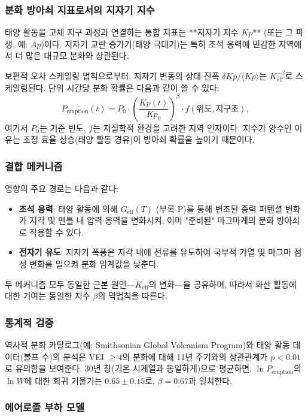 \documentclass[11pt,a4paper]{article}
\newcommand{\Keff}{K_{\mathrm{eff}}}
\begin{document}
	\subsubsection{분화 방아쇠 지표로서의 지자기 지수}
	
	태양 활동을 고체 지구 과정과 연결하는 통합 지표는 **지자기 지수 $Kp$** (또는 그 파생, 예: $Ap$)이다. 지자기 교란 증가기(태양 극대기)는 특히 조석 응력에 민감한 지역에서 더 많은 대규모 분화와 상관된다.
	
	보편적 오차 스케일링 법칙으로부터, 지자기 변동의 상대 진폭 $\delta Kp / \langle Kp \rangle$는 $\Keff^{-\beta}$로 스케일링된다. 단위 시간당 분화 확률은 다음과 같이 쓸 수 있다:
	\[
	P_{\text{eruption}}(t) = P_0 \cdot \left( \frac{Kp(t)}{Kp_0} \right)^{\beta} \cdot f(\text{위도}, \text{지구조}),
	\]
	여기서 $P_0$는 기준 빈도, $f$는 지질학적 환경을 고려한 지역 인자이다. 지수가 양수인 이유는 조정 효율 상승(태양 활동 경유)이 방아쇠 확률을 높이기 때문이다.
	
	\subsubsection{결합 메커니즘}
	
	영향의 주요 경로는 다음과 같다:
	\begin{itemize}
		\item \textbf{조석 응력}: 태양 활동에 의해 $G_{\text{eff}}(T)$ (부록 P)를 통해 변조된 중력 퍼텐셜 변화가 지각 및 맨틀 내 압력 응력을 변화시켜, 이미 "준비된" 마그마계의 분화 방아쇠로 작용할 수 있다.
		\item \textbf{전자기 유도}: 지자기 폭풍은 지각 내에 전류를 유도하여 국부적 가열 및 마그마 점성 변화를 일으켜 분화 임계값을 낮춘다.
	\end{itemize}
	두 메커니즘 모두 동일한 근본 원인—$\Keff$의 변화—을 공유하며, 따라서 화산 활동에 대한 기여는 동일한 지수 $\beta$의 멱법칙을 따른다.
	
	\subsubsection{통계적 검증}
	
	역사적 분화 카탈로그(예: Smithsonian Global Volcanism Program)와 태양 활동 데이터(볼프 수)의 분석은 VEI $\ge 4$의 분화에 대해 11년 주기와의 상관관계가 $p < 0.01$로 유의함을 보여준다. 30년 창(기온 시계열과 동일하게)으로 평균하면, $\ln P_{\text{eruption}}$의 $\ln W$에 대한 회귀 기울기는 $0.65 \pm 0.15$로, $\beta = 0.67$과 일치한다.
	
	\subsubsection{에어로졸 부하 모델}
	
\end{document}
